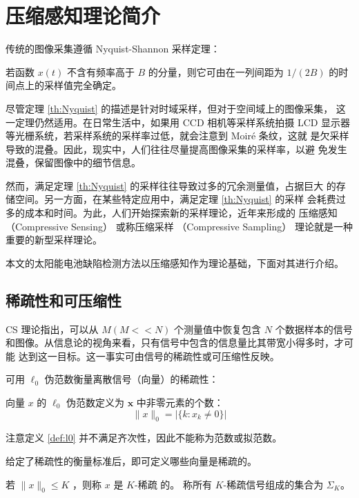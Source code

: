 \section{压缩感知理论简介}

传统的图像采集遵循 Nyquist-Shannon 采样定理：
\begin{theorem}[采样定理] \label{th:Nyquist}
若函数 $x(t)$ 不含有频率高于 $B$ 的分量，则它可由在一列间距为 $1/(2B)$
的时间点上的采样值完全确定。
\end{theorem}

尽管定理 \ref{th:Nyquist} 的描述是针对时域采样，但对于空间域上的图像采集，
这一定理仍然适用。在日常生活中，如果用 CCD 相机等采样系统拍摄 LCD 显示器
等光栅系统，若采样系统的采样率过低，就会注意到 Moir\'e 条纹，这就
是欠采样导致的混叠。因此，现实中，人们往往尽量提高图像采集的采样率，以避
免发生混叠，保留图像中的细节信息。

然而，满足定理 \ref{th:Nyquist} 的采样往往导致过多的冗余测量值，占据巨大
的存储空间。另一方面，在某些特定应用中，满足定理 \ref{th:Nyquist} 的采样
会耗费过多的成本和时间。为此，人们开始探索新的采样理论，近年来形成的
压缩感知 （Compressive Sensing） 或称压缩采样
（Compressive Sampling） 理论就是一种重要的新型采样理论。

本文的太阳能电池缺陷检测方法以压缩感知作为理论基础，下面对其进行介绍。

\subsection{稀疏性和可压缩性}

CS 理论指出，可以从 $M (M << N)$ 个测量值中恢复包含 $N$ 个数据样本的信号
和图像。从信息论的视角来看，只有信号中包含的信息量比其带宽小得多时，才可能
达到这一目标。这一事实可由信号的稀疏性或可压缩性反映。

可用 $\ell_0$ 伪范数衡量离散信号（向量）的稀疏性：

\begin{definition} \label{def:l0} 向量 $x$ 的
$\ell_0$ 伪范数定义为 $\mathbf{x}$ 中非零元素的个数：
\begin{equation}
\|x\|_0 = |\{k:x_k \neq 0\}|
\end{equation}
\end{definition}
注意定义 \ref{def:l0} 并不满足齐次性，因此不能称为范数或拟范数。

给定了稀疏性的衡量标准后，即可定义哪些向量是稀疏的。
\begin{definition}[$K$-稀疏] \label{def:K-sparse} 若
$\|x\|_0 \leq K$ ，则称 $x$ 是 $K$-稀疏 的。
称所有 $K$-稀疏信号组成的集合为 $\Sigma_K$。
\end{definition}

